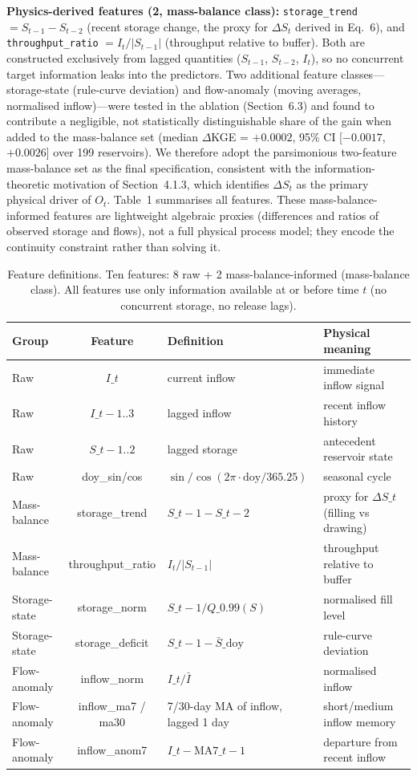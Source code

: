 \documentclass[journal]{ascelike-new}
\begin{document}
\textbf{Physics-derived features (2, mass-balance class):} \texttt{storage\_trend} $= S_{t-1} - S_{t-2}$ (recent storage change, the proxy for $\Delta S_t$ derived in Eq.~6), and \texttt{throughput\_ratio} $= I_t / |S_{t-1}|$ (throughput relative to buffer). Both are constructed exclusively from lagged quantities ($S_{t-1}$, $S_{t-2}$, $I_t$), so no concurrent target information leaks into the predictors. Two additional feature classes---storage-state (rule-curve deviation) and flow-anomaly (moving averages, normalised inflow)---were tested in the ablation (Section~6.3) and found to contribute a negligible, not statistically distinguishable share of the gain when added to the mass-balance set (median $\Delta$KGE = $+0.0002$, 95\% CI [$-0.0017$, $+0.0026$] over 199 reservoirs). We therefore adopt the parsimonious two-feature mass-balance set as the final specification, consistent with the information-theoretic motivation of Section~4.1.3, which identifies $\Delta S_t$ as the primary physical driver of $O_t$. Table~1 summarises all features. These mass-balance-informed features are lightweight algebraic proxies (differences and ratios of observed storage and flows), not a full physical process model; they encode the continuity constraint rather than solving it.


\begin{table}[t]
  \centering
  \caption{Feature definitions. Ten features: 8 raw + 2 mass-balance-informed (mass-balance class). All features use only information available at or before time $t$ (no concurrent storage, no release lags).}
  \begin{tabularx}{\textwidth}{l c X X}
    \toprule
    Group & Feature & Definition & Physical meaning \\
    \midrule
    Raw & $I\_t$ & current inflow & immediate inflow signal \\
    Raw & $I\_{t-1..3}$ & lagged inflow & recent inflow history \\
    Raw & $S\_{t-1..2}$ & lagged storage & antecedent reservoir state \\
    Raw & doy\_sin/cos & $\sin/\cos(2\pi\cdot\text{doy}/365.25)$ & seasonal cycle \\
    Mass-balance & storage\_trend & $S\_{t-1} - S\_{t-2}$ & proxy for $\Delta S\_t$ (filling vs drawing) \\
    Mass-balance & throughput\_ratio & $I_t / |S_{t-1}|$ & throughput relative to buffer \\
    Storage-state & storage\_norm & $S\_{t-1} / Q\_{0.99}(S)$ & normalised fill level \\
    Storage-state & storage\_deficit & $S\_{t-1} - \bar{S}\_{\text{doy}}$ & rule-curve deviation \\
    Flow-anomaly & inflow\_norm & $I\_t / \bar{I}$ & normalised inflow \\
    Flow-anomaly & inflow\_ma7 / ma30 & 7/30-day MA of inflow, lagged 1 day & short/medium inflow memory \\
    Flow-anomaly & inflow\_anom7 & $I\_t - \text{MA7}\_{t-1}$ & departure from recent inflow \\
    \bottomrule
  \end{tabularx}
\end{table}
\end{document}

